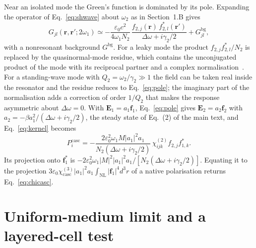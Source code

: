 \documentclass[9pt]{osa-supplemental-document}
\newcommand{\chitwo}{\chi^{(2)}}
\newcommand{\chicasc}{\chi^{(3)}_{\mathrm{casc}}}
\newcommand{\Dom}{\Delta\omega}
\newcommand{\f}{\mathbf f}
\newcommand{\NL}{\mathrm{NL}}
\begin{document}
Near an isolated mode the Green's function is dominated by its pole.
Expanding the operator of Eq.~\eqref{eq:shwave} about $\omega_2$ as in
Section~1.B gives
\begin{equation}
  G_{jl}(\mathbf r,\mathbf r';2\omega_1)\simeq
  -\frac{\varepsilon_0c^2}{4\omega_1N_2}\,
  \frac{f_{2,j}(\mathbf r)\,f^*_{2,l}(\mathbf r')}{\Dom+i\gamma_2/2}
  +G^{\mathrm{bg}}_{jl},
  \label{eq:pole}
\end{equation}
with a nonresonant background $G^{\mathrm{bg}}$.  For a leaky mode the
product $f_{2,j}f^*_{2,l}/N_2$ is replaced by the quasinormal-mode residue,
which contains the unconjugated product of the mode with its reciprocal
partner and a complex normalisation~\cite{sauvan2013,lalanne2018}.  For a
standing-wave mode with $Q_2=\omega_2/\gamma_2\gg1$ the field can be taken real inside the
resonator and the residue reduces to Eq.~\eqref{eq:pole}; the imaginary part
of the normalisation adds a correction of order $1/Q_2$ that makes the
response asymmetric about $\Dom=0$.  With $\mathbf E_1=a_1\f_1$,
Eq.~\eqref{eq:pole} gives $\mathbf E_2=a_2\f_2$ with
$a_2=-\beta a_1^2/(\Dom+i\gamma_2/2)$, the steady state of Eq.~(2) of the
main text, and Eq.~\eqref{eq:kernel} becomes
\begin{equation}
  P_i^{\mathrm{casc}}=-\frac{2\varepsilon_0^2\omega_1M|a_1|^2a_1}{N_2(\Dom+i\gamma_2/2)}\,
  \chitwo_{ijk}f_{2,j}f^*_{1,k}.
\end{equation}
Its projection onto $\f_1^*$ is
$-2\varepsilon_0^2\omega_1|M|^2|a_1|^2a_1/[N_2(\Dom+i\gamma_2/2)]$.
Equating it to the projection
$3\varepsilon_0\chicasc|a_1|^2a_1\int_{\NL}|\f_1|^4d^3r$ of a native
polarisation returns Eq.~\eqref{eq:chicasc}.

\section{Uniform-medium limit and a layered-cell test}
\end{document}
